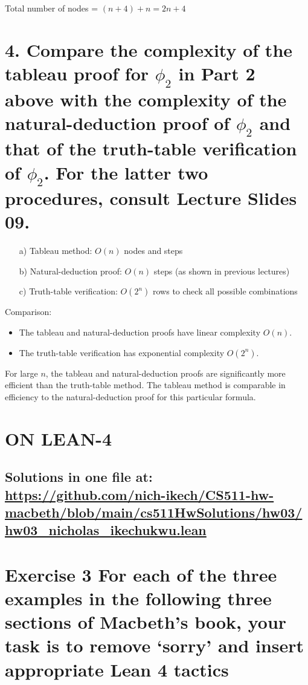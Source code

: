\documentclass{article}
\begin{document}
Total number of nodes = $(n+4) + n = 2n + 4$
\newpage

\section*{4. Compare the complexity of the tableau proof for $\phi_2$ in Part 2 above with the complexity of the natural-deduction proof of $\phi_2$ and that of the truth-table verification of $\phi_2$. For the latter two procedures, consult Lecture Slides 09.}

\begin{itemize}
    \item[a)] Tableau method: $O(n)$ nodes and steps
    \item[b)] Natural-deduction proof: $O(n)$ steps (as shown in previous lectures)
    \item[c)] Truth-table verification: $O(2^n)$ rows to check all possible combinations
\end{itemize}

Comparison:
\begin{itemize}
    \item The tableau and natural-deduction proofs have linear complexity $O(n)$.
    \item The truth-table verification has exponential complexity $O(2^n)$.
\end{itemize}

For large $n$, the tableau and natural-deduction proofs are significantly more efficient than the truth-table method. The tableau method is comparable in efficiency to the natural-deduction proof for this particular formula.

\newpage
\section*{ON LEAN-4}
\subsection*{Solutions in one file at: 
\url{https://github.com/nich-ikech/CS511-hw-macbeth/blob/main/cs511HwSolutions/hw03/hw03_nicholas_ikechukwu.lean}}

\newpage

\section*{Exercise 3 For each of the three examples in the following three sections of Macbeth’s book, your
task is to remove ‘sorry’ and insert appropriate Lean 4 tactics}
\end{document}
